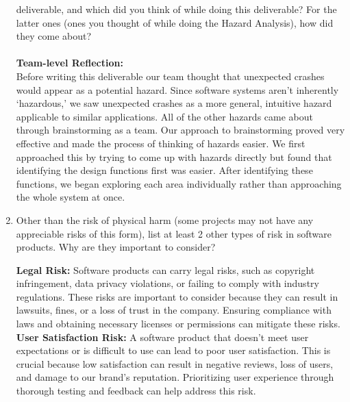 \documentclass{article}
\begin{document}
\begin{enumerate}
    deliverable, and which did you think of while doing this deliverable? For
    the latter ones (ones you thought of while doing the Hazard Analysis), how
    did they come about? \\\\
    \textbf{Team-level Reflection:}\\
    Before writing this deliverable our team thought that unexpected crashes would 
    appear as a potential hazard. Since software systems aren’t inherently ‘hazardous,’ 
    we saw unexpected crashes as a more general, intuitive hazard applicable to similar 
    applications. All of the other hazards came about through brainstorming as a team. 
    Our approach to brainstorming proved very effective and made the process of thinking 
    of hazards easier. We first approached this by trying to come up with hazards directly 
    but found that identifying the design functions first was easier. After identifying these 
    functions, we began exploring each area individually rather than approaching the whole system 
    at once. \\
    \item Other than the risk of physical harm (some projects may not have any
    appreciable risks of this form), list at least 2 other types of risk in
    software products. Why are they important to consider?

    \textbf{Legal Risk:} Software products can carry legal risks, such as copyright infringement, data privacy violations, or failing to comply with industry regulations. These risks are important to consider because they can result in lawsuits, fines, or a loss of trust in the company. Ensuring compliance with laws and obtaining necessary licenses or permissions can mitigate these risks. \\ 

    \textbf{User Satisfaction Risk:} A software product that doesn't meet user expectations or is difficult to use can lead to poor user satisfaction. This is crucial because low satisfaction can result in negative reviews, loss of users, and damage to our brand’s reputation. Prioritizing user experience through thorough testing and feedback can help address this risk. \\

\end{enumerate}
\end{document}

